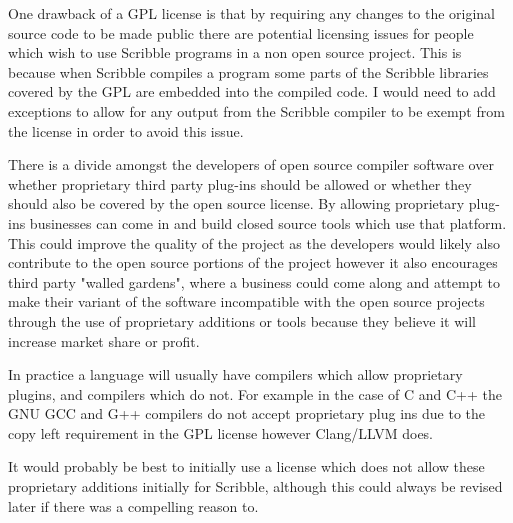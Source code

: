 \documentclass[]{final_report}
\begin{document}
One drawback of a GPL license is that by requiring any changes to the original source code to be made public there are potential licensing issues for people which wish to use Scribble programs in a non open source project. This is because when Scribble compiles a program some parts of the Scribble libraries covered by the GPL are embedded into the compiled code. I would need to add exceptions to allow for any output from the Scribble compiler to be exempt from the license in order to avoid this issue.

There is a divide amongst the developers of open source compiler software over whether proprietary third party plug-ins should be allowed or whether they should also be covered by the open source license. By allowing proprietary plug-ins businesses can come in and build closed source tools which use that platform. This could improve the quality of the project as the developers would likely also contribute to the open source portions of the project however it also encourages third party "walled gardens", where a business could come along and attempt to make their variant of the software incompatible with the open source projects through the use of proprietary additions or tools because they believe it will increase market share or profit.

In practice a language will usually have compilers which allow proprietary plugins, and compilers which do not. For example in the case of C and C++ the GNU GCC and G++ compilers do not accept proprietary plug ins due to the copy left requirement in the GPL license however Clang/LLVM does.

It would probably be best to initially use a license which does not allow these proprietary additions initially for Scribble, although this could always be revised later if there was a compelling reason to.
\end{document}
